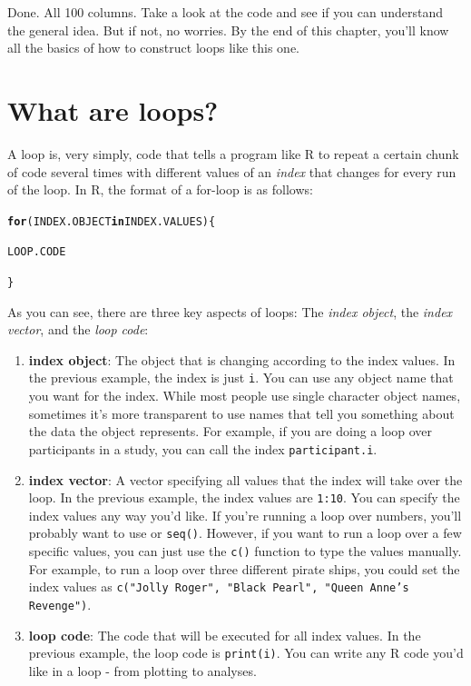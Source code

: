 \documentclass{tufte-book}\usepackage[]{graphicx}\usepackage[]{color}
\makeatletter
\newcommand{\hlstd}[1]{\textcolor[rgb]{0.345,0.345,0.345}{#1}}%
\newcommand{\hlkwa}[1]{\textcolor[rgb]{0.161,0.373,0.58}{\textbf{#1}}}%
\newenvironment{kframe}{%
 \def\at@end@of@kframe{}%
 \ifinner\ifhmode%
  \def\at@end@of@kframe{\end{minipage}}%
  \begin{minipage}{\columnwidth}%
 \fi\fi%
 \def\FrameCommand##1{\hskip\@totalleftmargin \hskip-\fboxsep
 \colorbox{shadecolor}{##1}\hskip-\fboxsep
     \hskip-\linewidth \hskip-\@totalleftmargin \hskip\columnwidth}%
 \MakeFramed {\advance\hsize-\width
   \@totalleftmargin\z@ \linewidth\hsize
   \@setminipage}}%
 {\par\unskip\endMakeFramed%
 \at@end@of@kframe}
\newenvironment{knitrout}{}{} %
\makeatother
\begin{document}
Done. All 100 columns. Take a look at the code and see if you can understand the general idea. But if not, no worries. By the end of this chapter, you'll know all the basics of how to construct loops like this one.


\section{What are loops?}

A loop is, very simply, code that tells a program like R to repeat a certain chunk of code several times with different values of an \textit{index} that changes for every run of the loop. In R, the format of a for-loop is as follows:

\begin{knitrout}
\color{fgcolor}\begin{kframe}
\begin{alltt}
\hlkwa{for}\hlstd{(INDEX.OBJECT} \hlkwa{in} \hlstd{INDEX.VALUES) \{}

  \hlstd{LOOP.CODE}

  \hlstd{\}}
\end{alltt}
\end{kframe}
\end{knitrout}


As you can see, there are three key aspects of loops: The \textit{index object}, the \textit{index vector}, and the \textit{loop code}:

\begin{enumerate}

  \item \textbf{index object}: The object that is changing according to the index values. In the previous example, the index is just \texttt{i}. You can use any object name that you want for the index. While most people use single character object names, sometimes it's more transparent to use names that tell you something about the data the object represents. For example, if you are doing a loop over participants in a study, you can call the index \texttt{participant.i}.

  \item \textbf{index vector}: A vector specifying all values that the index will take over the loop. In the previous example, the index values are \texttt{1:10}. You can specify the index values any way you'd like. If you're running a loop over numbers, you'll probably want to use  or \texttt{seq()}. However, if you want to run a loop over a few specific values, you can just use the \texttt{c()} function to type the values manually. For example, to run a loop over three different pirate ships, you could set the index values as \texttt{c("Jolly Roger", "Black Pearl", "Queen Anne's Revenge")}.

  \item \textbf{loop code}: The code that will be executed for all index values. In the previous example, the loop code is \texttt{print(i)}. You can write any R code you'd like in a loop - from plotting to analyses.

\end{enumerate}
\end{document}
